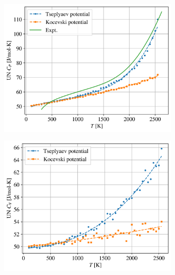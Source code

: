 \documentclass[preprint, 12pt]{elsarticle}
\begin{document}
\begin{figure}[h!]
\centering
\begin{subfigure}{0.45\textwidth}
    \includegraphics[width=\textwidth]{UNCP.png}
    \caption{}
    \label{Fig:UNCP}
\end{subfigure}
\hfill
\begin{subfigure}{0.45\textwidth}
    \includegraphics[width=\textwidth]{UNCV.png}
    \caption{}
    \label{Fig:UNCV}
\end{subfigure}
\hfill
\begin{subfigure}{0.45\textwidth}

\end{subfigure}
\end{figure}
\end{document}
